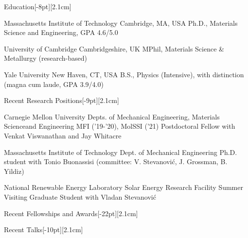 \documentclass{cv} %
\begin{document}
\thispagestyle{empty}
\begin{cvSection}{Education}[-8pt][2.1cm]

     {Massachusetts Institute of Technology}
     {Cambridge, MA, USA}
     {Ph.D., Materials Science and Engineering, GPA 4.6/5.0}

     {University of Cambridge}
     {Cambridgeshire, UK}
     {MPhil, Materials Science \& Metallurgy (research-based)}

     {Yale University}
     {New Haven, CT, USA}
     {B.S., Physics (Intensive), with distinction (magna cum laude, GPA 3.9/4.0)}

\end{cvSection}

\begin{cvSection}{Recent Research Positions}[-9pt][2.1cm]

    {Carnegie Mellon University}
    {Depts. of Mechanical Engineering, Materials Science\newline and Engineering}
    {MFI ('19-'20), MolSSI ('21) Postdoctoral Fellow with Venkat Viswanathan and Jay Whitacre}

    {Massachusetts Institute of Technology}
    {Dept. of Mechanical Engineering}
    {Ph.D. student with Tonio Buonassisi (committee: V. Stevanovi\'c, J. Grossman, B. Yildiz)}

    {National Renewable Energy Laboratory}
    {Solar Energy Research Facility}
    {Summer Visiting Graduate Student with Vladan Stevanovi\'c}

\end{cvSection}


\begin{cvSection}{Recent Fellowships and Awards}[-22pt][2.1cm]
    
\end{cvSection}

\begin{pubsSection}
  
\end{pubsSection}

\begin{cvSection}{Recent Talks}[-10pt][2.1cm]
    
\end{cvSection}
\end{document}
